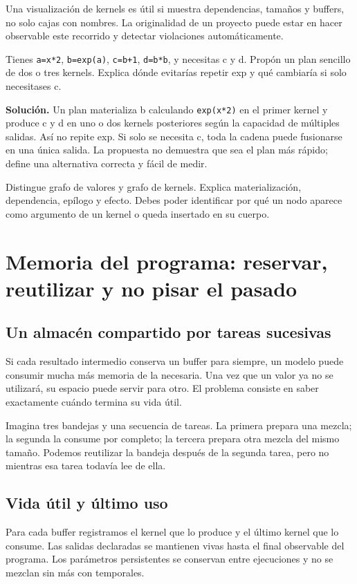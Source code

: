 \documentclass[12pt,a4paper,oneside]{report}
\begin{document}
Una visualización de kernels es útil si muestra dependencias, tamaños y buffers, no solo cajas con nombres. La originalidad de un proyecto puede estar en hacer observable este recorrido y detectar violaciones automáticamente.

\begin{practica}
Tienes \texttt{a=x*2}, \texttt{b=exp(a)}, \texttt{c=b+1}, \texttt{d=b*b}, y necesitas c y d. Propón un plan sencillo de dos o tres kernels. Explica dónde evitarías repetir exp y qué cambiaría si solo necesitases c.

\end{practica}
\textbf{Solución.} Un plan materializa b calculando \texttt{exp(x*2)} en el primer kernel y produce c y d en uno o dos kernels posteriores según la capacidad de múltiples salidas. Así no repite exp. Si solo se necesita c, toda la cadena puede fusionarse en una única salida. La propuesta no demuestra que sea el plan más rápido; define una alternativa correcta y fácil de medir.

\begin{comprueba}
Distingue grafo de valores y grafo de kernels. Explica materialización, dependencia, epílogo y efecto. Debes poder identificar por qué un nodo aparece como argumento de un kernel o queda insertado en su cuerpo.

\end{comprueba}
\chapter{Memoria del programa: reservar, reutilizar y no pisar el pasado}
\label{ch:arena}
\section{Un almacén compartido por tareas sucesivas}
Si cada resultado intermedio conserva un buffer para siempre, un modelo puede consumir mucha más memoria de la necesaria. Una vez que un valor ya no se utilizará, su espacio puede servir para otro. El problema consiste en saber exactamente cuándo termina su vida útil.

Imagina tres bandejas y una secuencia de tareas. La primera prepara una mezcla; la segunda la consume por completo; la tercera prepara otra mezcla del mismo tamaño. Podemos reutilizar la bandeja después de la segunda tarea, pero no mientras esa tarea todavía lee de ella.

\section{Vida útil y último uso}
Para cada buffer registramos el kernel que lo produce y el último kernel que lo consume. Las salidas declaradas se mantienen vivas hasta el final observable del programa. Los parámetros persistentes se conservan entre ejecuciones y no se mezclan sin más con temporales.
\end{document}
